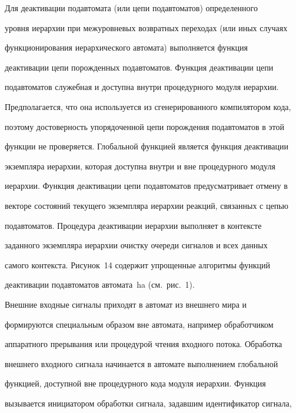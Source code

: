       


      Для деактивации подавтомата (или цепи подавтоматов) определенного 


уровня иерархии при межуровневых возвратных переходах (или иных случаях 


функционирования иерархического автомата) выполняется функция 


деактивации цепи порожденных подавтоматов. Функция деактивации цепи 


подавтоматов служебная и доступна внутри процедурного модуля иерархии. 


Предполагается, что она используется из сгенерированного компилятором кода, 


поэтому достоверность упорядоченной цепи порождения подавтоматов в этой 


функции не проверяется. Глобальной функцией является функция деактивации 


экземпляра иерархии, которая доступна внутри и вне процедурного модуля 


иерархии. Функция деактивации цепи подавтоматов предусматривает отмену в 


векторе состояний текущего экземпляра иерархии реакций, связанных с цепью 


подавтоматов. Процедура деактивации иерархии выполняет в контексте 


заданного экземпляра иерархии очистку очереди сигналов и всех данных 


самого контекста. Рисунок~14 содержит упрощенные алгоритмы функций 


деактивации подавтоматов автомата~ha (см.\ рис.~1).


      








      Внешние входные сигналы приходят в автомат из внешнего мира и 


формируются специальным образом вне автомата, например обработчиком 


аппаратного прерывания или процедурой чтения входного потока. Обработка 


внешнего входного сигнала начинается в автомате выполнением глобальной 


функцией, доступной вне процедурного кода модуля иерархии. Функция 


вызывается инициатором обработки сигнала, задавшим идентификатор сигнала, 


